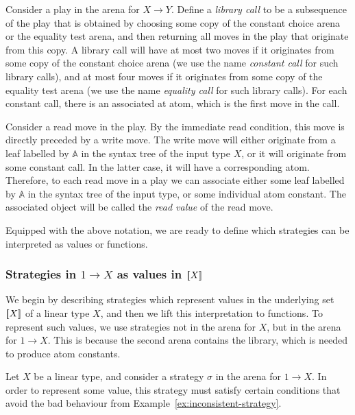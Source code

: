 \documentclass[10pt,a4paper]{amsart}
\numberwithin{equation}{section}
\theoremstyle{plain}
\newcommand{\sem}[1]{[{\kern-0.45ex}[#1]{\kern-0.45ex}]}
\newcommand{\atoms}{\mathbb A}
\begin{document}
Consider a play in the arena for $X \to Y$. Define a \emph{library call} to be a subsequence of the play that is obtained by choosing some copy of the constant choice arena or the equality test arena, and then returning all moves in the play that originate from this copy. A library call will have at most two moves if it originates from some copy of the constant choice arena (we use the name \emph{constant call} for such library calls), and at most four moves if it originates from some copy of the equality test arena (we use the name \emph{equality call} for such library calls). For each constant call, there is an associated at atom, which is the first move in the call. 

Consider a read move in the play. By the immediate read condition, this move is directly preceded by a write move. The write move will either originate from a leaf labelled by $\atoms$ in  the syntax tree of the input type $X$, or it will originate from some constant call. In the latter case, it will have a corresponding atom. Therefore, to each read move in a play we can associate either some leaf labelled by $\atoms$ in the syntax tree of the input type, or some individual atom constant. The associated object will be called the \emph{read value} of the read move.

Equipped with the above notation, we are ready to define which strategies  can  be interpreted as values or functions.

\subsubsection{Strategies in $1 \to X$ as values in $\sem X$}
\label{sec:strategies-in-1-to-x-as-elements-of-sem-x}
  We begin by describing strategies which represent values in the underlying set $\sem X$ of a linear type $X$, and then we lift this interpretation to functions.  To represent such values, we  use strategies not in the arena for $X$, but in the arena for $1 \to X$. This is because the second arena contains the library, which is needed to  produce  atom constants.

  Let $X$ be a linear type, and consider a strategy $\sigma$ in the arena for $1 \to X$. 
  In order to represent some value, this strategy must satisfy certain conditions that avoid the bad behaviour  from Example~\ref{ex:inconsistent-strategy}.   
  
\end{document}

